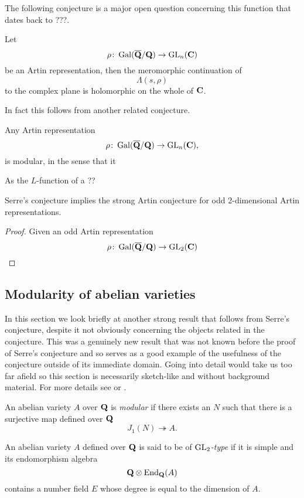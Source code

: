 \documentclass[a4paper,12pt]{article}
\begin{document}
The following conjecture is a major open question concerning this function that dates back to ???.

\begin{conjecture}
Let
\[
\rho\colon \operatorname{Gal}(\overline{\mathbf{Q}}/\mathbf{Q}) \to \operatorname{GL}_n(\mathbf{C})
\]
be an Artin representation, then the meromorphic continuation of
\[
\Lambda(s,\rho)
\]
to the complex plane is holomorphic on the whole of $\mathbf{C}$.
\end{conjecture}

In fact this follows from another related conjecture.

\begin{conjecture}
Any Artin representation
\[
\rho\colon \operatorname{Gal}(\overline{\mathbf{Q}}/\mathbf{Q}) \to \operatorname{GL}_n(\mathbf{C}),
\]
is modular, in the sense that it
\end{conjecture}

As the $L$-function of a ??

\begin{prop}
Serre's conjecture implies the strong Artin conjecture for odd 2-dimensional Artin representations.
\end{prop}
\begin{proof}
Given an odd Artin representation
\[
\rho\colon \operatorname{Gal}(\overline{\mathbf{Q}}/\mathbf{Q})\to \operatorname{GL}_2(\mathbf{C})
\]

\end{proof}

\fi

\subsection{Modularity of abelian varieties}
In this section we look briefly at another strong result that follows from Serre's conjecture, despite it not obviously concerning the objects related in the conjecture.
This was a genuinely new result that was not known before the proof of Serre's conjecture and so serves as a good example of the usefulness of the conjecture outside of its immediate domain.
Going into detail would take us too far afield so this section is necessarily sketch-like and without background material.
For more details see \cite{Ribet04} or \cite[chap. 15]{RibetSteinBook}.

\begin{defn}
An abelian variety $A$ over $\mathbf{Q}$ is \emph{modular} if there exists an $N$ such that there is a surjective map defined over $\mathbf{Q}$
\[
J_1(N) \twoheadrightarrow A.
\]
\end{defn}

\begin{defn}
An abelian variety $A$ defined over $\mathbf{Q}$ is said to be of \emph{$\operatorname{GL}_2$-type} if it is simple and its endomorphism algebra
\[
\mathbf{Q}\otimes \operatorname{End}_{\mathbf{Q}}(A)
\]
contains a number field $E$ whose degree is equal to the dimension of $A$.
\end{defn}
\end{document}
